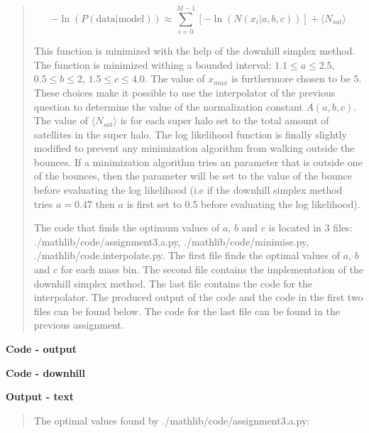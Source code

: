\begin{quote}
\begin{equation}
- \ln(P(\text{data}|\text{model})) \approx \sum_{i=0}^{M-1} \left[- \ln(N(x_i | a, b, c)) \right] +\langle N_{sat} \rangle
\end{equation}


This function is minimized with the help of the downhill simplex method. The function is minimized withing a bounded interval: $1.1 \leq a \leq 2.5$, $0.5 \leq b \leq 2$, $1.5 \leq c \leq 4.0$. The value of $x_{max}$ is furthermore chosen to be 5. These choices make it possible to use the interpolator of the previous question to determine the value of the normalization constant $A(a, b, c)$. The value of $\langle N_{sat} \rangle$ is for each super halo set to the total amount of satellites in the super halo. The log likelihood function is finally slightly modified to prevent any minimization algorithm from walking outside the bounces. If a minimization algorithm tries an parameter that is outside one of the bounces, then the parameter will be set to the value of the bounce before evaluating the log likelihood (i.e if the downhill simplex method  tries $a = 0.47$ then $a$ is first set to 0.5 before evaluating the log likelihood).



The code that finds the optimum values of $a$, $b$ and $c$ is located in 3 files:
\textsf{./mathlib/code/assignment3.a.py},  \textsf{./mathlib/code/minimise.py}, \textsf{./mathlib/code.interpolate.py}. The first file finds the optimal values of $a$, $b$ and $c$ for each mass bin. The second file contains the implementation of the downhill simplex method. The last file contains the code for the interpolator. The produced output of the code and the code in the first two files can be found below. The code for the last file can be found in the previous assignment. 

\end{quote}


\textbf{Code - output}
\begin{quote}

\end{quote}

\textbf{Code - downhill}
\begin{quote}

\end{quote}

\textbf{Output - text}
\begin{quote}
The optimal values found by \textsf{./mathlib/code/assignment3.a.py}:

\end{quote}
\newpage

